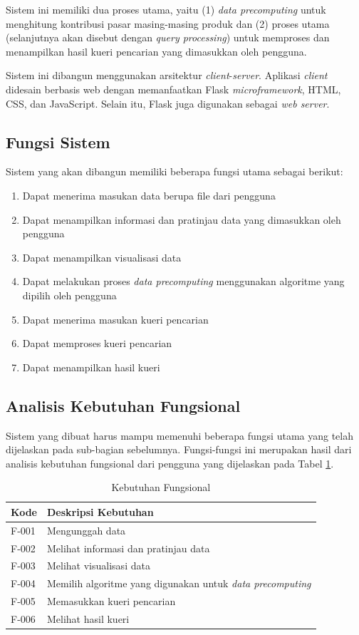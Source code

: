 Sistem ini memiliki dua proses utama, yaitu (1) \textit{data precomputing} untuk menghitung kontribusi pasar masing-masing produk dan (2) proses utama (selanjutnya akan disebut dengan \textit{query processing}) untuk memproses dan menampilkan hasil kueri pencarian yang dimasukkan oleh pengguna.

Sistem ini dibangun menggunakan arsitektur \textit{client}-\textit{server}. Aplikasi \textit{client} didesain berbasis web dengan memanfaatkan Flask \textit{microframework}, HTML, CSS, dan JavaScript. Selain itu, Flask juga digunakan sebagai \textit{web server}. 

\pagebreak
\subsection{Fungsi Sistem}
\tab Sistem yang akan dibangun memiliki beberapa fungsi utama sebagai berikut:
\begin{enumerate}
	\item Dapat menerima masukan data berupa file dari pengguna
	\item Dapat menampilkan informasi dan pratinjau data yang dimasukkan oleh pengguna
	\item Dapat menampilkan visualisasi data
	\item Dapat melakukan proses \textit{data precomputing} menggunakan algoritme yang dipilih oleh pengguna
	\item Dapat menerima masukan kueri pencarian 
	\item Dapat memproses kueri pencarian
	\item Dapat menampilkan hasil kueri
\end{enumerate}

\subsection{Analisis Kebutuhan Fungsional}
\tab Sistem yang dibuat harus mampu memenuhi beberapa fungsi utama yang telah dijelaskan pada sub-bagian sebelumnya. Fungsi-fungsi ini merupakan hasil dari analisis kebutuhan fungsional dari pengguna yang dijelaskan pada Tabel \ref{tab:kebutuhan-fungsional}.

\begin{table}[H]
	\centering
	\begin{tabular}{ | p{2cm} | p{7cm} | }
		\hline
		\textbf{Kode} & \textbf{Deskripsi Kebutuhan} \\ \hline \hline
		F-001 & Mengunggah data \\ \hline
		F-002 & Melihat informasi dan pratinjau data \\ \hline
		F-003 & Melihat visualisasi data  \\ \hline
		F-004 & Memilih algoritme yang digunakan untuk \textit{data precomputing}\\ \hline
		F-005 & Memasukkan kueri pencarian \\ \hline
		F-006 & Melihat hasil kueri \\ \hline
	\end{tabular} \caption{Kebutuhan Fungsional}
	\label{tab:kebutuhan-fungsional}
\end{table}

